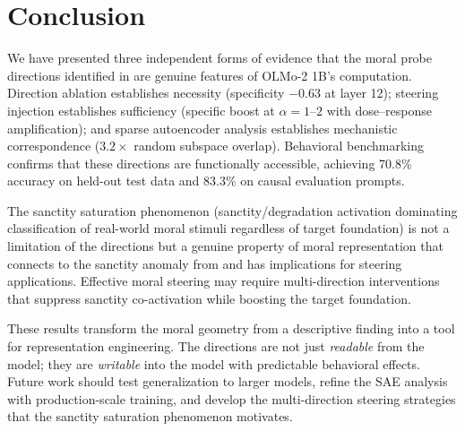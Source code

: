 \section{Conclusion}\label{conclusion}

We have presented three independent forms of evidence that the moral probe directions identified in \citet{reblitzrichardson2026geometry} are genuine features of OLMo-2 1B's computation.
Direction ablation establishes necessity (specificity \(-0.63\) at layer 12); steering injection establishes sufficiency (specific boost at \(\alpha = 1\)--\(2\) with dose--response amplification); and sparse autoencoder analysis establishes mechanistic correspondence (\(3.2\times\) random subspace overlap).
Behavioral benchmarking confirms that these directions are functionally accessible, achieving 70.8\% accuracy on held-out test data and 83.3\% on causal evaluation prompts.

The sanctity saturation phenomenon (sanctity/degradation activation dominating classification of real-world moral stimuli regardless of target foundation) is not a limitation of the directions but a genuine property of moral representation that connects to the sanctity anomaly from \citet{reblitzrichardson2026geometry} and has implications for steering applications.
Effective moral steering may require multi-direction interventions that suppress sanctity co-activation while boosting the target foundation.

These results transform the moral geometry from a descriptive finding into a tool for representation engineering.
The directions are not just \emph{readable} from the model; they are \emph{writable} into the model with predictable behavioral effects.
Future work should test generalization to larger models, refine the SAE analysis with production-scale training, and develop the multi-direction steering strategies that the sanctity saturation phenomenon motivates.
